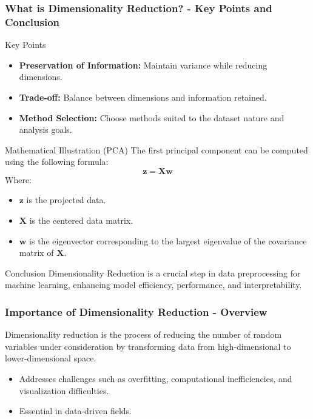 \documentclass[aspectratio=169]{beamer}
\begin{document}
\begin{frame}[fragile]
    \frametitle{What is Dimensionality Reduction? - Key Points and Conclusion}
    \begin{block}{Key Points}
        \begin{itemize}
            \item \textbf{Preservation of Information:} Maintain variance while reducing dimensions.
            \item \textbf{Trade-off:} Balance between dimensions and information retained.
            \item \textbf{Method Selection:} Choose methods suited to the dataset nature and analysis goals.
        \end{itemize}
    \end{block}
    
    \begin{block}{Mathematical Illustration (PCA)}
        The first principal component can be computed using the following formula:
        \begin{equation}
            \mathbf{z} = \mathbf{X}\mathbf{w}
        \end{equation}
        Where:
        \begin{itemize}
            \item $\mathbf{z}$ is the projected data.
            \item $\mathbf{X}$ is the centered data matrix.
            \item $\mathbf{w}$ is the eigenvector corresponding to the largest eigenvalue of the covariance matrix of $\mathbf{X}$.
        \end{itemize}
    \end{block}
    
    \begin{block}{Conclusion}
        Dimensionality Reduction is a crucial step in data preprocessing for machine learning, enhancing model efficiency, performance, and interpretability.
    \end{block}
\end{frame}

\begin{frame}[fragile]
    \frametitle{Importance of Dimensionality Reduction - Overview}
    Dimensionality reduction is the process of reducing the number of random variables under consideration by transforming data from high-dimensional to lower-dimensional space.
    
    \begin{itemize}
        \item Addresses challenges such as overfitting, computational inefficiencies, and visualization difficulties.
        \item Essential in data-driven fields.
    \end{itemize}
\end{frame}
\end{document}
